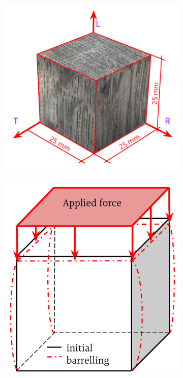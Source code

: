\documentclass[review]{elsarticle}
\begin{document}
\begin{figure}
    \centering
    \begin{subfigure}[b]{0.4\textwidth}
        \centering
        \includegraphics[width=\textwidth]{VasaCube.pdf}
        \caption{}
        \label{fig:vasacube}
    \end{subfigure}
    \hfill
    \begin{subfigure}[b]{0.4\textwidth}
        \centering
        \includegraphics[width=\textwidth]{BarellingEffectZoomed.pdf}

\end{subfigure}
\end{figure}
\end{document}
